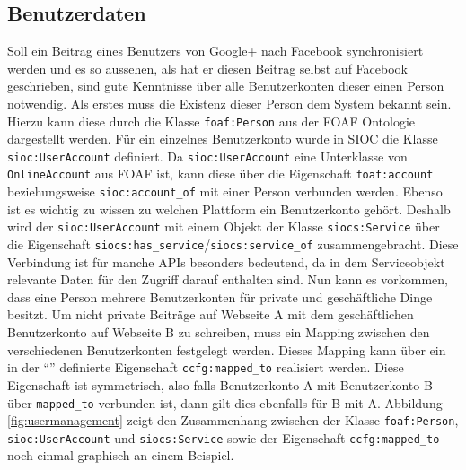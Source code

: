 
\subsection{Benutzerdaten} %
\label{sub:benutzerdaten}

Soll ein Beitrag eines Benutzers von Google+ nach Facebook synchronisiert werden und es so aussehen, als hat er diesen Beitrag selbst auf Facebook geschrieben, sind gute Kenntnisse über alle Benutzerkonten dieser einen Person notwendig. Als erstes muss die Existenz dieser Person dem System bekannt sein. Hierzu kann diese durch die Klasse \texttt{foaf:Person} aus der FOAF Ontologie dargestellt werden. Für ein einzelnes Benutzerkonto wurde in SIOC die Klasse \texttt{sioc:UserAccount} definiert. Da \texttt{sioc:UserAccount} eine Unterklasse von \texttt{OnlineAccount} aus FOAF ist, kann diese über die Eigenschaft \texttt{foaf:account} beziehungsweise \texttt{sioc:account\_of} mit einer Person verbunden werden. Ebenso ist es wichtig zu wissen zu welchen Plattform ein Benutzerkonto gehört. Deshalb wird der \texttt{sioc:UserAccount} mit einem Objekt der Klasse \texttt{siocs:Service} über die Eigenschaft \texttt{siocs:has\_service}/\texttt{siocs:service\_of} zusammengebracht. Diese Verbindung ist für manche APIs besonders bedeutend, da in dem Serviceobjekt relevante Daten für den Zugriff darauf enthalten sind. Nun kann es vorkommen, dass eine Person mehrere Benutzerkonten für private und geschäftliche Dinge besitzt. Um nicht private Beiträge auf Webseite A mit dem geschäftlichen Benutzerkonto auf Webseite B zu schreiben, muss ein Mapping zwischen den verschiedenen Benutzerkonten festgelegt werden. Dieses Mapping kann über ein in der \enquote{} definierte Eigenschaft \texttt{ccfg:mapped\_to} realisiert werden. Diese Eigenschaft ist symmetrisch, also falls Benutzerkonto A mit Benutzerkonto B über \texttt{mapped\_to} verbunden ist, dann gilt dies ebenfalls für B mit A. Abbildung \ref{fig:usermanagement} zeigt den Zusammenhang zwischen der Klasse \texttt{foaf:Person}, \texttt{sioc:UserAccount} und \texttt{siocs:Service} sowie der Eigenschaft \texttt{ccfg:mapped\_to} noch einmal graphisch an einem Beispiel.

